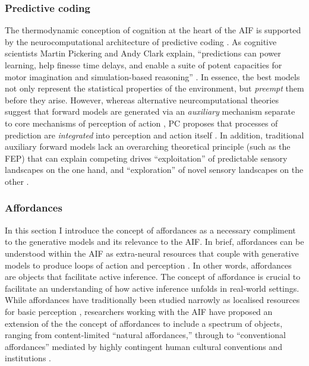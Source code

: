 \begin{CJK}{UTF8}{gbsn}
\subsubsection{Predictive coding\label{sect:predictiveCoding}}
The thermodynamic conception of cognition at the heart of the AIF is supported by the neurocomputational architecture of predictive coding  \citep[hereafter PC, see][]{Rao1999,Clark2013}.   As cognitive scientists Martin Pickering and Andy Clark explain, ``predictions can power learning, help finesse time delays, and enable a suite of potent capacities for motor imagination and simulation-based reasoning'' \citep[6]{Pickering2014}.  In essence, the best models not only represent the statistical properties of the environment, but \textit{preempt} them before they arise.
However, whereas alternative neurcomputational theories suggest that forward models are generated via an \textit{auxiliary} mechanism separate to core mechanisms of perception of action \citep{Wolpert1997}, PC proposes that processes of prediction are \textit{integrated} into perception and action itself \citep[for a more detailed review of Auxiliary Forward Models and Integrative Forward Models, see Appendix~\ref{app2:motorControl};][]{Pickering2014}.  In addition, traditional auxiliary forward models lack an overarching theoretical principle (such as the FEP) that can explain competing drives ``exploitation'' of predictable sensory landscapes on the one hand, and ``exploration'' of novel sensory landscapes on the other \citep[also known as the dark room dilemma, explained in detail below in Section~\ref{sect:surprise}]{Clark2013}.






\subsubsection{Affordances\label{sect:affordances}}
In this section I introduce the concept of affordances as a necessary compliment to the generative models and its relevance to the AIF.  In brief, affordances can be understood within the AIF as extra-neural resources that couple with generative models to produce loops of action and perception \citep{Ramstead2016,Clark2015}.  In other words, affordances are objects that facilitate active inference.  The concept of affordance is crucial to facilitate an understanding of how active inference unfolds in real-world settings. While affordances have traditionally been studied narrowly as localised resources for basic perception \citep[e.g.][]{Fajen2011}, researchers working with the AIF have proposed an extension of the the concept of affordances to include a spectrum of objects, ranging from content-limited ``natural affordances,'' through to ``conventional affordances'' mediated by highly contingent human cultural conventions and institutions  \citep[see][]{Roepstorff2010,Ramstead2016}.


\end{CJK}
